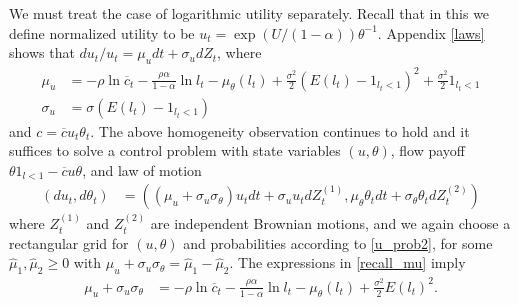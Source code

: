 \documentclass[11pt]{article}
\theoremstyle{plain}
\begin{document}
We must treat the case of logarithmic utility separately. Recall that in this we define normalized utility to be $u_t = \exp(U/(1-\alpha))\theta^{-1}$. Appendix \ref{laws} shows that $du_t/u_t = \mu_udt + \sigma_udZ_t$, where
\begin{equation}
\begin{aligned} %
\mu_u & = -\rho \ln \overline{c}_t - \frac{\rho\alpha}{1-\alpha} \ln l_t - \mu_{\theta}(l_t) + \frac{\sigma^2}{2}(E(l_t) - 1_{l_t<1})^2 + \frac{\sigma^2}{2}1_{l_t<1}
\\ \sigma_u & = \sigma (E(l_t) - 1_{l_t<1})
\end{aligned}
\label{normlawLOG2}
\end{equation}
and $c = \overline{c}u_t\theta_t$. The above homogeneity observation continues to hold and it suffices to solve a control problem with state variables $(u,\theta)$, flow payoff $\theta 1_{l<1} - \overline{c}u\theta$, and law of motion 
\begin{equation}
\begin{aligned}
(du_t, d\theta_t) & = {\left((\mu_u + \sigma_u \sigma_{\theta})u_tdt + \sigma_uu_tdZ_t^{(1)}, \mu_{\theta}\theta_tdt + \sigma_{\theta}\theta_tdZ_t^{(2)}\right)}
\end{aligned}
\label{newLAWlog}
\end{equation}
where $Z_t^{(1)}$ and $Z_t^{(2)}$ are independent Brownian motions, and we again choose a rectangular grid for $(u,\theta)$ and probabilities according to \eqref{u_prob2}, for some $\hat{\mu}_1, \hat{\mu}_2 \geq 0$ with $\mu_u + \sigma_u\sigma_{\theta} = \hat{\mu}_1 - \hat{\mu}_2$. The expressions in \eqref{recall_mu} imply
\begin{align*}
\mu_u + \sigma_u\sigma_{\theta} & %
 = -\rho \ln \overline{c}_t - \frac{\rho\alpha}{1-\alpha} \ln l_t - \mu_{\theta}(l_t) + \frac{\sigma^2}{2}E(l_t)^2.
\end{align*} 
\end{document}
